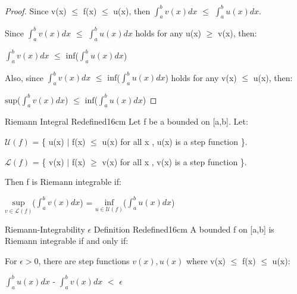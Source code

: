     \begin{proof}
        Since v(x) $\leq$ f(x) $\leq$ u(x), then
        $\int_a^b v(x) dx$ $\leq$ $\int_a^b u(x) dx$.
        
        Since $\int_a^b v(x) dx$ $\leq$ $\int_a^b u(x) dx$ holds for
        any u(x) $\geq$ v(x), then:

        \hspace{0.5cm}
        $\int_a^b v(x) dx$
        $\leq$ $\text{inf}$($\int_a^b u(x) dx$)

        Also, since $\int_a^b v(x) dx$
        $\leq$ $\text{inf}$($\int_a^b u(x) dx$)
        holds for any v(x) $\leq$ u(x), then:

        \hspace{0.5cm}
        $\text{sup}$($\int_a^b v(x) dx$)
        $\leq$ $\text{inf}$($\int_a^b u(x) dx$)
    \end{proof}

    \vspace{0.5cm}



    \begin{definition}{Riemann Integral Redefined}{16cm}
        Let f be a bounded on [a,b]. Let:

        \hspace{0.5cm}
        $\mathcal{U}(f)$
        = \{ u(x) $|$ f(x) $\leq$ u(x) for all x , u(x) is a step function \}.
        
        \hspace{0.5cm}
        $\mathcal{L}(f)$
        = \{ v(x) $|$ f(x) $\geq$ v(x) for all x , v(x) is a step function \}.

        Then f is Riemann integrable if:

        \hspace{0.5cm}
        $\underset{v \in \mathcal{L}(f)}{\text{sup}}$($\int_a^b v(x) dx$)
        = $\underset{u \in \mathcal{U}(f)}{\text{inf}}$($\int_a^b u(x) dx$)
    \end{definition}

    \vspace{0.5cm}



    \begin{wtheorem}{Riemann-Integrability $\epsilon$ Definition Redefined}{16cm}
        A bounded f on [a,b] is Riemann integrable if and only if:

        \hspace{0.5cm}
        For $\epsilon > 0$, there are step functions $v(x),u(x)$
        where v(x) $\leq$ f(x) $\leq$ u(x):

        \hspace{1cm}
        $\int_a^b u(x) dx$ - $\int_a^b v(x) dx$ $<$ $\epsilon$
    \end{wtheorem}


